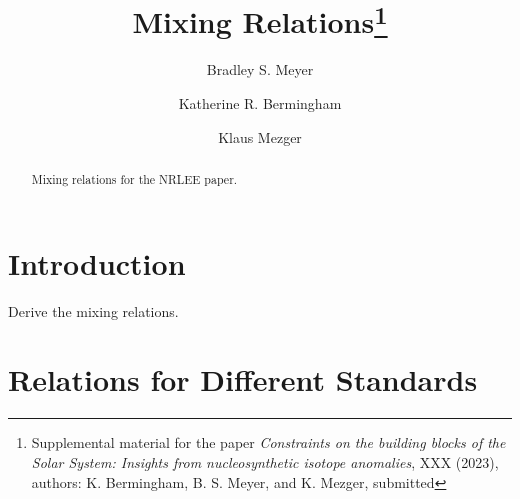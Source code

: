 \documentclass[preprint]{revtex4-2}
\begin{document}
\title{Mixing Relations\footnote{Supplemental material for the paper
{\it Constraints on the building blocks of the Solar System: Insights from nucleosynthetic isotope anomalies}, XXX (2023), authors: K. Bermingham,
B. S. Meyer, and K. Mezger, submitted}}
\author{Bradley S. Meyer}
\author{Katherine R. Bermingham}
\author{Klaus Mezger}

\begin{abstract}
Mixing relations for the NRLEE paper.
\end{abstract}

\maketitle

\section{Introduction}\label{sec:intro}

Derive the mixing relations.

\section{Relations for Different Standards} \label{sec:initial}
\end{document}
